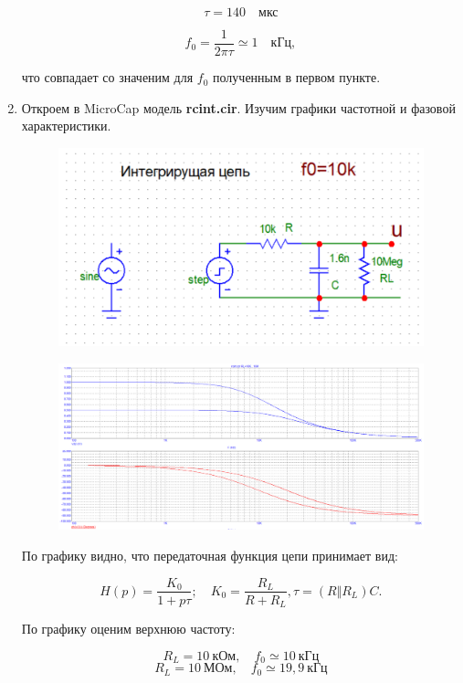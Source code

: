 \documentclass[a4paper, 12pt]{article}%
\begin{document}
\begin{enumerate}
\[\tau = 140 \quad \textit{мкс}\]

\[f_0 = \frac{1}{2\pi\tau} \simeq 1 \quad \textit{кГц},\]

что совпадает со значеним для $f_0$ полученным в первом пункте.

\item Откроем в MicroCap модель \textbf{rcint.cir}. Изучим графики частотной и фазовой характеристики.

\begin{figure}[h!]
\centering
\includegraphics[scale=0.4]{rcint_img.png}
\label{fig:Image1}
\end{figure}

\begin{figure}[h!]
\centering
\includegraphics[scale=0.4]{rcint_AC.png}
\label{fig:Image1}
\end{figure}

По графику видно, что передаточная функция цепи принимает вид:

\[H(p) = \frac{K_0}{1 + p\tau}; \quad K_0 = \frac{R_L}{R + R_L},\tau = (R\Vert R_L) C.\]

По графику оценим верхнюю частоту:

\[R_L = 10 \: \textit{кОм}, \quad f_0 \simeq 10 \: \textit{кГц}\]
\[R_L = 10 \: \textit{МОм}, \quad f_0 \simeq 19,9 \: \textit{кГц}\]


\end{enumerate}
\end{document}
